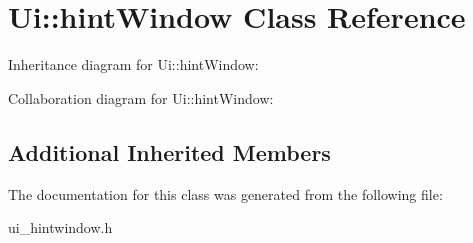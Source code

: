 \hypertarget{classUi_1_1hintWindow}{}\section{Ui\+:\+:hint\+Window Class Reference}
\label{classUi_1_1hintWindow}


Inheritance diagram for Ui\+:\+:hint\+Window\+:


Collaboration diagram for Ui\+:\+:hint\+Window\+:
\subsection*{Additional Inherited Members}


The documentation for this class was generated from the following file\+:\begin{DoxyCompactItemize}
\item 
ui\+\_\+hintwindow.\+h\end{DoxyCompactItemize}

